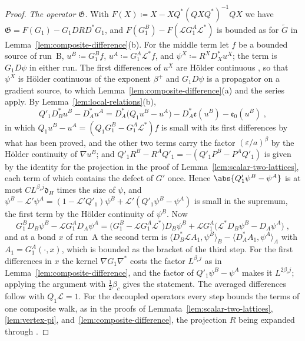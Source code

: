 \begin{proof}
\emph{The operator $\mathfrak G$.} With $F(X) \coloneqq X - XQ^*(QXQ^*)^{-1}QX$ we have $\mathfrak G = F(G_1) - G_1DRD^*G_1$, and $F(G^B_1) - F(\mathcal LG^A_1\mathcal L^*)$ is bounded as for $\tilde G$ in Lemma~\ref{lem:composite-difference}(b). For the middle term let $f$ be a bounded source of run~B, $u^B \coloneqq G^B_1f$, $u^A \coloneqq G^A_1\mathcal L^*f$, and $\psi^X \coloneqq R^XD_X^*u^X$; the term is $G_1D\psi$ in either run. The first differences of $u^X$ are H\"older continuous \cite[(3.43)]{BalabanPBG}, so that $\psi^X$ is H\"older continuous of the exponent $\beta^+$ and $G_1D\psi$ is a propagator on a gradient source, to which Lemma~\ref{lem:composite-difference}(a) and the series apply. By Lemma~\ref{lem:local-relations}(b),
\[
    Q'_1D_B^*u^B - D_A^*u^A = D_A^*\bigl(Q_1u^B - u^A\bigr) - D_A^*\mathfrak e(u^B) - \mathfrak e_0(u^B)\;,
\]
in which $Q_1u^B - u^A = (Q_1G^B_1 - G^A_1\mathcal L^*)f$ is small with its first differences by what has been proved, and the other two terms carry the factor $(\varepsilon/a)^\beta$ by the H\"older continuity of $\nabla u^B$; and $Q'_1R^B - R^AQ'_1 = -(Q'_1P^B - P^AQ'_1)$ is given by the identity for the projection in the proof of Lemma~\ref{lem:scalar-two-lattices}, each term of which contains the defect of $G'$ once. Hence $\abs{Q'_1\psi^B - \psi^A}$ is at most $CL^{\beta_cj}\mathfrak d_H$ times the size of $\psi$, and $\psi^B - \mathcal L'\psi^A = (1 - \mathcal L'Q'_1)\psi^B + \mathcal L'(Q'_1\psi^B - \psi^A)$ is small in the supremum, the first term by the H\"older continuity of $\psi^B$. Now
\[
    G^B_1D_B\psi^B - \mathcal LG^A_1D_A\psi^A = \bigl(G^B_1 - \mathcal LG^A_1\mathcal L^*\bigr)D_B\psi^B + \mathcal LG^A_1\bigl(\mathcal L^*D_B\psi^B - D_A\psi^A\bigr)\;,
\]
and at a bond $x$ of run~A the second term is $\langle D_B^*\mathcal LA_1, \psi^B\rangle_B - \langle D_A^*A_1, \psi^A\rangle_A$ with $A_1 = G^A_1(\cdot, x)$, which is bounded as the bracket of the third step. For the first differences in $x$ the kernel $\nabla G_1\nabla^*$ costs the factor $L^{\beta_cj}$ as in Lemma~\ref{lem:composite-difference}, and the factor of $Q'_1\psi^B - \psi^A$ makes it $L^{2\beta_cj}$; applying the argument with $\frac{1}{2}\beta_c$ gives the statement. The averaged differences follow with $Q_1\mathcal L = 1$. For the decoupled operators every step bounds the terms of one composite walk, as in the proofs of Lemmata~\ref{lem:scalar-two-lattices}, \ref{lem:vertex-pi}, and~\ref{lem:composite-difference}, the projection $R$ being expanded through \cite[(3.90), (3.98)]{BalabanPBG}.
\end{proof}

